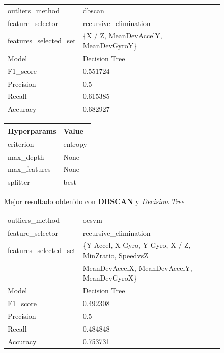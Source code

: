 \begin{appendices}
		\begin{figure}[htb]
			\centering
			\begin{tabular}{ll}
				\toprule
					  outliers\_method &                               dbscan \\
					 feature\_selector &                recursive\_elimination \\
				features\_selected\_set & \{X / Z, MeanDevAccelY, MeanDevGyroY\} \\
								Model &                        Decision Tree \\
						F1\_score &                             0.551724 \\
					   Precision &                                  0.5 \\
						  Recall &                             0.615385 \\
						Accuracy &                             0.682927 \\
				\bottomrule
			\end{tabular}
			\newline
			\newline

			\begin{tabular}{ll}
				\toprule
				 Hyperparams &   Value \\
				\midrule
				   criterion & entropy \\
				   max\_depth &    None \\
				max\_features &    None \\
					splitter &    best \\
				\bottomrule
			\end{tabular}
			\caption{Mejor resultado obtenido con \textbf{DBSCAN} y \emph{Decision Tree}}
			\label{table:15}
		\end{figure}

		\begin{figure}[htb]
			\centering
			\begin{tabular}{ll}
				\toprule
					  outliers\_method &                                              ocsvm \\
					 feature\_selector &                              recursive\_elimination \\
				features\_selected\_set & \{Y Accel, X Gyro, Y Gyro, X / Z, MinZratio, SpeedvsZ \\
									{} & MeanDevAccelX, MeanDevAccelY, MeanDevGyroX\} \\
								Model &                                      Decision Tree \\
						F1\_score &                                           0.492308 \\
					   Precision &                                                0.5 \\
						  Recall &                                           0.484848 \\
						Accuracy &                                           0.753731 \\
				\bottomrule
			\end{tabular}
			\newline
			\newline


\end{figure}
\end{appendices}
